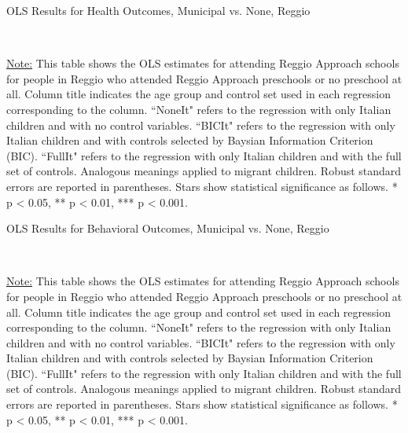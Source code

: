 \begin{table}[H] \caption{OLS Results for Health Outcomes, Municipal vs. None, Reggio} \label{ols-H-child-reg}

\vspace{1ex} \\
\footnotesize\raggedright{\underline{Note:} This table shows the OLS estimates for attending Reggio Approach schools for people in Reggio who attended Reggio Approach preschools or no preschool at all. Column title indicates the age group and control set used in each regression corresponding to the column. ``NoneIt" refers to the regression with only Italian children and with no control variables. ``BICIt" refers to the regression with only Italian children and with controls selected by Baysian Information Criterion (BIC). ``FullIt" refers to the regression with only Italian children and with the full set of controls. Analogous meanings applied to migrant children. Robust standard errors are reported in parentheses. Stars show statistical significance as follows. * p < 0.05, ** p < 0.01, *** p < 0.001.}
\end{table}

\begin{table}[H] \caption{OLS Results for Behavioral Outcomes, Municipal vs. None, Reggio} \label{ols-B-child-reg}

\vspace{1ex} \\
\footnotesize\raggedright{\underline{Note:} This table shows the OLS estimates for attending Reggio Approach schools for people in Reggio who attended Reggio Approach preschools or no preschool at all. Column title indicates the age group and control set used in each regression corresponding to the column. ``NoneIt" refers to the regression with only Italian children and with no control variables. ``BICIt" refers to the regression with only Italian children and with controls selected by Baysian Information Criterion (BIC). ``FullIt" refers to the regression with only Italian children and with the full set of controls. Analogous meanings applied to migrant children. Robust standard errors are reported in parentheses. Stars show statistical significance as follows. * p < 0.05, ** p < 0.01, *** p < 0.001.}
\end{table}





